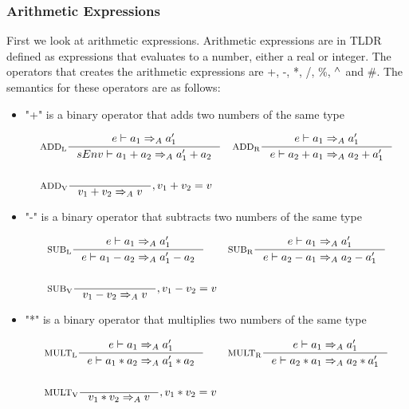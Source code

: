 \subsubsection{Arithmetic Expressions}

First we look at arithmetic expressions. Arithmetic expressions are in TLDR defined as expressions that evaluates to a number, either a real or integer. The operators that creates the arithmetic expressions are +, -, *, /, \%, $^\wedge{}$ and \#. The semantics for these operators are as follows:

\begin{itemize}
\item "+" is a binary operator that adds two numbers of the same type

\begin{align*}
&\inference[$\text{ADD}_\text{L}$]{e \vdash a_1 \Rightarrow_A a_1'}
                    {sEnv \vdash  a_1 + a_2 \Rightarrow_A a_1' + a_2}
&
&\inference[$\text{ADD}_\text{R}$]{e \vdash a_1 \Rightarrow_A a_1'}
                    {e \vdash a_2 + a_1 \Rightarrow_A a_2 + a_1'}
\\\\
&\inference[$\text{ADD}_\text{V}$]{}
                    {v_1 + v_2 \Rightarrow_A v}
                    {, v_1 + v_2 = v}
\end{align*}

\item "-" is a binary operator that subtracts two numbers of the same type

\begin{align*}
&\inference[$\text{SUB}_\text{L}$]{e \vdash a_1 \Rightarrow_A a_1'}
                    {e \vdash a_1 - a_2 \Rightarrow_A a_1' - a_2}
&
&\inference[$\text{SUB}_\text{R}$]{e \vdash a_1 \Rightarrow_A a_1'}
                    {e \vdash a_2 - a_1 \Rightarrow_A a_2 - a_1'}
\\\\
&\inference[$\text{SUB}_\text{V}$]{}
                    {v_1 - v_2 \Rightarrow_A v}
                    {, v_1 - v_2 = v}
\end{align*}

\item "*" is a binary operator that multiplies two numbers of the same type

\begin{align*}
&\inference[$\text{MULT}_\text{L}$]{e \vdash a_1 \Rightarrow_A a_1'}
                     {e \vdash a_1 * a_2 \Rightarrow_A a_1' * a_2}
&
&\inference[$\text{MULT}_\text{R}$]{e \vdash a_1 \Rightarrow_A a_1'}
                     {e \vdash a_2 * a_1 \Rightarrow_A a_2 * a_1'}
\\\\
&\inference[$\text{MULT}_\text{V}$]{}
                     {v_1 * v_2 \Rightarrow_A v}
                     {, v_1 * v_2 = v}
\end{align*}


\end{itemize}
